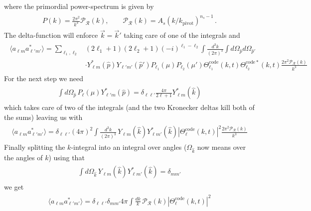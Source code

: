 where the primordial power-spectrum is given by
{\small\begin{align}
\begin{aligned}
    P(k)=\frac{2\pi^{2}}{k^{3}}\mathcal{P}_{\mathcal{R}}(k), \qquad \mathcal{P}_{\mathcal{R}}(k)=A_{s}(k/k_{\mathrm{pivot}})^{n_{s}-1}\,.
\end{aligned}
\end{align}}
The delta-function will enforce $\vec{k}=\vec{k}'$ taking care of one of the integrals and
{\small\begin{align}
\begin{aligned}
    \langle a_{\ell m}a_{\ell' m'}^{*}\rangle =\sum_{\ell_{1},\ell_{2}}& (2\ell_{1}+1)(2\ell_{2}+1)(-i)^{\ell_{1}-\ell_{2}} \int \frac{d^{3}k}{(2\pi)^{3}} \int d\Omega_{\hat{p}} d\Omega_{\hat{p}'}\\
    &\cdot Y_{\ell m}^{*}(\hat{p})Y_{\ell' m'}(\hat{p}')P_{\ell_{1}}(\mu)P_{\ell_{2}}(\mu')\Theta_{\ell_{1}}^{\mathrm{code}}(k, t)\Theta_{\ell_{2}}^{\mathrm{code}*}(k, t)\frac{2\pi^{2}\mathcal{P}_{\mathcal{R}}(k)}{k^{3}}
\end{aligned}
\end{align}}
For the next step we need
{\small\begin{align}
\begin{aligned}
    \int d\Omega_{\hat{p}}\, P_{\ell}(\mu)Y_{\ell' m}^{*}(\hat{p})=\delta_{\ell\ell'}\frac{4\pi}{2\ell+1}Y_{\ell m}^{*}(\hat{k})
\end{aligned}
\end{align}}
which takes care of two of the integrals (and the two Kronecker deltas kill both of the sums) leaving us with
{\small\begin{align}
\begin{aligned}
    \langle a_{\ell m}a_{\ell' m'}^{*}\rangle =\delta_{\ell\ell'}(4\pi)^{2}\int \frac{d^{3}k}{(2\pi)^{3}}\, Y_{\ell m}(\hat{k})Y_{\ell m'}^{*}(\hat{k})|\Theta_{\ell}^{\mathrm{code}}(k, t)|^{2}\frac{2\pi^{2}\mathcal{P}_{\mathcal{R}}(k)}{k^{3}}
\end{aligned}
\end{align}}
Finally splitting the $k$-integral into an integral over angles ($\Omega_{\hat{k}}$ now means over the angles of $k$) using that
{\small\begin{align}
\begin{aligned}
    \int d\Omega_{\hat{k}}\, Y_{\ell m}(\hat{k})Y_{\ell m'}^{*}(\hat{k})=\delta_{mm'}
\end{aligned}
\end{align}}
we get
{\small\begin{align}
\begin{aligned}
    \langle a_{\ell m}a_{\ell' m'}^{*}\rangle =\delta_{\ell\ell'}\delta_{mm'}4\pi \int \frac{dk}{k}\,\mathcal{P}_{\mathcal{R}}(k)|\Theta_{\ell}^{\mathrm{code}}(k, t)|^{2}
\end{aligned}
\end{align}}
